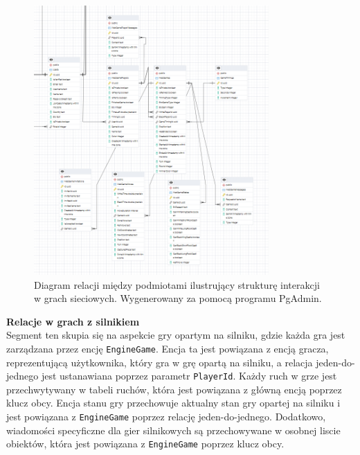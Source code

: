 \documentclass[twoside]{projektInzynierskiMS1}
\begin{document}
\vspace{0.5cm}
\begin{figure}[h!]
    \centering
    \includegraphics[width=0.8\textwidth]{images/ERD_online.png}
    \caption{Diagram relacji między podmiotami ilustrujący strukturę interakcji w grach sieciowych. Wygenerowany za pomocą programu PgAdmin.}
\end{figure}

\newpage

\noindent \textbf{Relacje w grach z silnikiem}\\
Segment ten skupia się na aspekcie gry opartym na silniku, gdzie każda gra jest zarządzana przez encję \texttt{EngineGame}. Encja ta jest powiązana z encją gracza, reprezentującą użytkownika, który gra w grę opartą na silniku, a relacja jeden-do-jednego jest ustanawiana poprzez parametr \texttt{PlayerId}. Każdy ruch w grze jest przechwytywany w tabeli ruchów, która jest powiązana z główną encją poprzez klucz obcy. Encja stanu gry przechowuje aktualny stan gry opartej na silniku i jest powiązana z \texttt{EngineGame} poprzez relację jeden-do-jednego. Dodatkowo, wiadomości specyficzne dla gier silnikowych są przechowywane w osobnej liscie obiektów, która jest powiązana z \texttt{EngineGame} poprzez klucz obcy.
\end{document}
